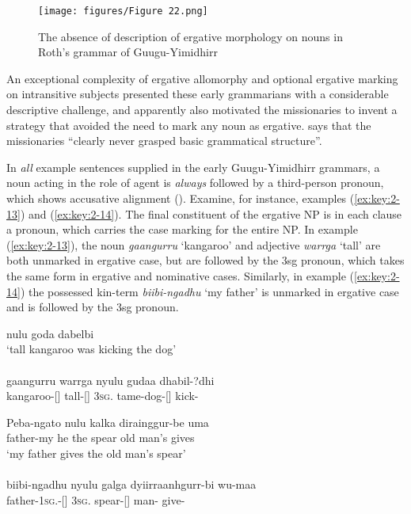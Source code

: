 \begin{figure}
\texttt{[image: figures/Figure 22.png]}
\caption{The absence of description of ergative morphology on nouns in Roth’s grammar of Guugu-Yimidhirr \citep[16]{roth_structure_1901}}
\label{fig:2:22}
\end{figure} 

An exceptional complexity of ergative allomorphy \citep[51]{haviland_guugu_1979} and optional ergative marking on intransitive subjects \citep[154--156]{haviland_guugu_1979} presented these early grammarians with a considerable descriptive challenge, and apparently also motivated the missionaries to invent a strategy that avoided the need to mark any noun as ergative. \citet[133]{haviland_guugu_1979} says that the missionaries “clearly never grasped basic grammatical structure”.

In \textit{all} example sentences supplied in the early Guugu-Yimidhirr grammars, a noun acting in the role of agent is \textit{always} followed by a third-person pronoun, which shows accusative alignment (). Examine, for instance, examples (\ref{ex:key:2-13}) and (\ref{ex:key:2-14}). The final constituent of the ergative NP is in each clause a pronoun, which carries the case marking for the entire NP. In example (\ref{ex:key:2-13}), the noun \textit{gaangurru} `kangaroo' and adjective \textit{warrga} `tall' are both unmarked in ergative case, but are followed by the 3sg pronoun, which takes the same form in ergative and nominative cases. Similarly, in example (\ref{ex:key:2-14}) the possessed kin-term \textit{biibi-ngadhu} `my father' is unmarked in ergative case and is followed by the 3sg pronoun.

\ea\label{ex:key:2-13}\label{ex:2:13}
 {nulu goda dabelbi}\\
{`tall kangaroo} {was kicking the dog'} \\
\glt \citep[23]{roth_structure_1901} \\
\gll gaangurru warrga nyulu gudaa dhabil-?dhi\\
kangaroo-[] tall-[] 3\textsc{sg}. tame-dog-[] kick-\\
\z

\ea\label{ex:key:2-14}\label{ex:2:14}
\gll Peba-ngato nulu kalka dirainggur-be uma\\
father-my he {the spear} {old man’s} gives\\
\glt `my father gives the old man’s spear' \\
\citep[29]{roth_structure_1901} \\
\gll biibi-ngadhu nyulu galga dyiirraanhgurr-bi wu-maa\\
father-1\textsc{sg}.-[] 3\textsc{sg}. spear-[] man- give-\\
\z

